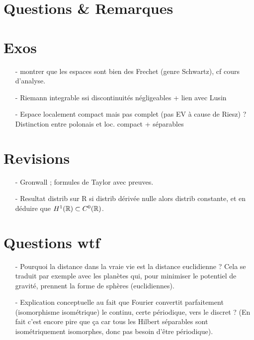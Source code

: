 \documentclass[11pt,a4paper]{article}
\begin{document}











\section{Questions \& Remarques}
\section{Exos}
\begin{itemize}
\item[-] montrer que les espaces sont bien des Frechet (genre Schwartz), cf cours d'analyse.
\item[-] Riemann integrable ssi discontinuités négligeables + lien avec Lusin
\item[-] Espace localement compact mais pas complet (pas EV à cause de Riesz) ? Distinction entre polonais et loc. compact + séparables 
\end{itemize}

\section{Revisions}
\begin{itemize}
\item[-] Gronwall ; formules de Taylor avec preuves.
\item[-] Resultat distrib sur R si distrib dérivée nulle alors distrib constante, et en déduire que $H^1(\mathbb R) \subset C^0(\mathbb R)$.
\end{itemize}

\section{Questions wtf}
\begin{itemize}
\item[-] Pourquoi la distance dans la vraie vie est la distance euclidienne ? Cela se traduit par exemple avec les planètes qui, pour minimiser le potentiel de gravité, prennent la forme de sphères (euclidiennes). \\
\item[-] Explication conceptuelle au fait que Fourier convertit parfaitement (isomorphisme isométrique) le continu, certe périodique, vers le discret ? (En fait c'est encore pire que ça car tous les Hilbert séparables sont isométriquement isomorphes, donc pas besoin d'être périodique).
\end{itemize}
\end{document}
